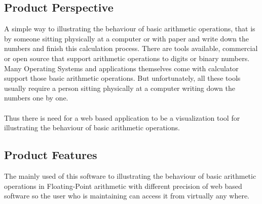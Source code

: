 \documentclass[11pt]{article}
\begin{document}

\subsection{Product Perspective}%
A simple way to illustrating the behaviour of basic arithmetic operations, that is by someone sitting physically at a computer or with paper and write down the numbers and finish this calculation process. There are tools available, commercial or open source that support arithmetic operations to digits or binary numbers. Many Operating Systems and applications themselves come with calculator support those basic arithmetic operations. But unfortunately, all these tools usually require a person sitting physically at a computer writing down the numbers one by one.\\
\\Thus there is need for a web based application to be a visualization tool for illustrating the behaviour of basic arithmetic operations.

\subsection{Product Features}%
The mainly used of this software to illustrating the behaviour of basic arithmetic operations in Floating-Point arithmetic with different precision of web based software so the user who is maintaining can access it from virtually any where.\\
\end{document}

